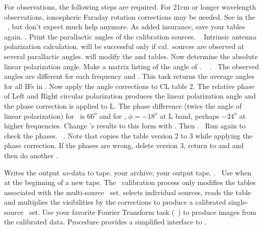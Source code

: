 
For  observations, the following steps are
required.  For 21cm or longer wavelength observations, ionospheric
Faraday rotation corrections may be needed.  See  in the
\AIPS\ \COOKBOOK, but don't expect much help anymore.
\beddes
{} As added insurance, save your tables again.
.
 Print the parallactic angles of the calibration
sources.
~
 Intrinsic antenna polarization calculation.
 will be successful
only if cal.~sources are observed at several parallactic angles.
 will modify the  and  tables.
 Now determine the absolute linear polarization angle.
Make a matrix listing of the angle of \TCPCL.
~
.~
The observed angles are different for each frequency and \IF.  This
task returns the average angles for all IFs in \@.
 Now apply the angle corrections to CL table 2.  The
relative phase of Left and Right circular polarization produces the
linear polarization angle and the phase correction is applied to L.
The phase difference (twice the angle of linear polarization) for
\TCPCL\ is $66^o$ and for \TCOTE, $\phi=-18^o$ at L band, perhaps
$-24^o$ at higher frequencies.  Change 's results to this
form with \@.  Then
.~
Run  again to check the phases.~
\@.  Note that  copies the
 table version 2 to 3 while applying the phase correction.
If the phases are wrong, delete version 3, return to  and
 and then do another .
\eeddes


\beddes
{} Writes the output {\it uv}-data to tape.
 your archive;  your output tape.
.~  Use
 when at the beginning of a new tape.
 The \AIPS\ calibration process only modifies the
tables associated with the multi-source \uvdata\ set.  
selects individual sources, reads the \CL table and multiplies the
visibilities by the corrections to produce a calibrated single-source
\uvdata\ set.
 Use your favorite Fourier Transform task
(\eg\ ) to produce images from the calibrated data.
Procedure  provides a simplified interface to
\@.
\eeddes

